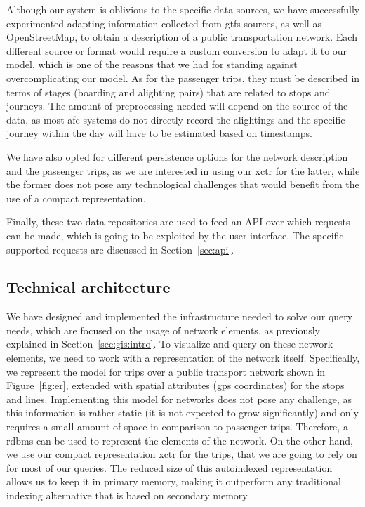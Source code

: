 	Although our system is oblivious to the specific data sources, we have successfully experimented adapting information collected from \gls{gtfs} sources, as well as OpenStreetMap, to obtain a description of a public transportation network. Each different source or format would require a custom conversion to adapt it to our model, which is one of the reasons that we had for standing against overcomplicating our model. As for the passenger trips, they must be described in terms of stages (boarding and alighting pairs) that are related to stops and journeys. The amount of preprocessing needed will depend on the source of the data, as most \acrfull{afc} systems do not directly record the alightings and the specific journey within the day will have to be estimated based on timestamps.
	
	We have also opted for different persistence options for the network description and the passenger trips, as we are interested in using our \gls{xctr} for the latter, while the former does not pose any technological challenges that would benefit from the use of a compact representation.
	
	Finally, these two data repositories are used to feed an API over which requests can be made, which is going to be exploited by the user interface. The specific supported requests are discussed in Section~\ref{sec:api}.
	
	\subsection{Technical architecture}
	We have designed and implemented the infrastructure needed to solve our query needs, which are focused on the usage of network elements, as previously explained in Section~\ref{sec:gis:intro}. 
	To visualize and query on these network elements, we need to work with a representation of the network itself. Specifically, we represent the model for trips over a public transport network shown in Figure~\ref{fig:er}, extended with spatial attributes (gps coordinates) for the stops and lines. Implementing this model for networks does not pose any challenge, as this information is rather static (it is not expected to grow significantly) and only requires a small amount of space in comparison to passenger trips. Therefore, a \gls{rdbms} can be used  to represent the elements of the network. On the other hand, we use our compact representation \gls{xctr} for the trips, that we are going to rely on for most of our queries. The reduced size of this autoindexed representation allows us to keep it in primary memory, making it outperform any traditional indexing alternative that is based on secondary memory.


